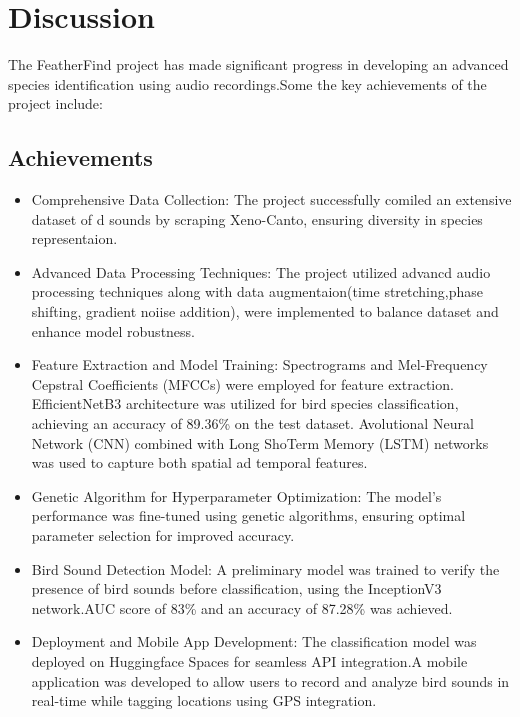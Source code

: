 \newpage

\chapter{Discussion}
The FeatherFind project has made significant progress in developing an advanced
species identification using audio recordings.Some the key achievements of the
project include:
\section{Achievements}
\begin{itemize}
    \item Comprehensive Data Collection: The project successfully comiled an extensive
          dataset of d sounds by scraping Xeno-Canto, ensuring diversity in species
          representaion.
    \item Advanced Data Processing Techniques: The project utilized advancd audio
          processing techniques along with data augmentaion(time stretching,phase
          shifting, gradient noiise addition), were implemented to balance dataset and
          enhance model robustness.
    \item Feature Extraction and Model Training: Spectrograms and Mel-Frequency Cepstral
          Coefficients (MFCCs) were employed for feature extraction. EfficientNetB3
          architecture was utilized for bird species classification, achieving an
          accuracy of 89.36\% on the test dataset. Avolutional Neural Network (CNN)
          combined with Long ShoTerm Memory (LSTM) networks was used to capture both
          spatial ad temporal features.
    \item Genetic Algorithm for Hyperparameter Optimization: The model's performance was
          fine-tuned using genetic algorithms, ensuring optimal parameter selection for
          improved accuracy.
    \item Bird Sound Detection Model: A preliminary model was trained to verify the
          presence of bird sounds before classification, using the InceptionV3
          network.AUC score of 83\% and an accuracy of 87.28\% was achieved.
    \item Deployment and Mobile App Development: The classification model was deployed on
          Huggingface Spaces for seamless API integration.A mobile application was
          developed to allow users to record and analyze bird sounds in real-time while
          tagging locations using GPS integration.
\end{itemize}

